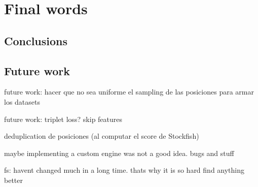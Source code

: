 \section{Final words}
\subsection{Conclusions}
\subsection{Future work}




future work: hacer que no sea uniforme el sampling de las posiciones para armar los datasets

future work: triplet loss? skip features

deduplication de posiciones (al computar el score de Stockfish)

maybe implementing a custom engine was not a good idea. bugs and stuff

fs: havent changed much in a long time. thats why it is so hard find anything better
